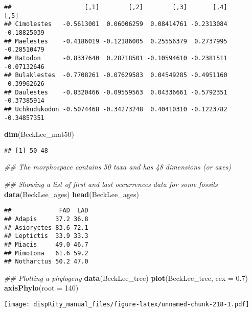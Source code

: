 \documentclass[
]{book}
\newenvironment{Shaded}{\begin{snugshade}}{\end{snugshade}}
\newcommand{\CommentTok}[1]{\textcolor[rgb]{0.56,0.35,0.01}{\textit{#1}}}
\newcommand{\DataTypeTok}[1]{\textcolor[rgb]{0.13,0.29,0.53}{#1}}
\newcommand{\DecValTok}[1]{\textcolor[rgb]{0.00,0.00,0.81}{#1}}
\newcommand{\FloatTok}[1]{\textcolor[rgb]{0.00,0.00,0.81}{#1}}
\newcommand{\KeywordTok}[1]{\textcolor[rgb]{0.13,0.29,0.53}{\textbf{#1}}}
\newcommand{\NormalTok}[1]{#1}
\begin{document}
\begin{verbatim}
##                    [,1]        [,2]        [,3]       [,4]        [,5]
## Cimolestes   -0.5613001  0.06006259  0.08414761 -0.2313084 -0.18825039
## Maelestes    -0.4186019 -0.12186005  0.25556379  0.2737995 -0.28510479
## Batodon      -0.8337640  0.28718501 -0.10594610 -0.2381511 -0.07132646
## Bulaklestes  -0.7708261 -0.07629583  0.04549285 -0.4951160 -0.39962626
## Daulestes    -0.8320466 -0.09559563  0.04336661 -0.5792351 -0.37385914
## Uchkudukodon -0.5074468 -0.34273248  0.40410310 -0.1223782 -0.34857351
\end{verbatim}

\begin{Shaded}
\begin{Highlighting}[]
\KeywordTok{dim}\NormalTok{(BeckLee\_mat50)}
\end{Highlighting}
\end{Shaded}

\begin{verbatim}
## [1] 50 48
\end{verbatim}

\begin{Shaded}
\begin{Highlighting}[]
\CommentTok{\#\# The morphospace contains 50 taxa and has 48 dimensions (or axes)}

\CommentTok{\#\# Showing a list of first and last occurrences data for some fossils}
\KeywordTok{data}\NormalTok{(BeckLee\_ages)}
\KeywordTok{head}\NormalTok{(BeckLee\_ages)}
\end{Highlighting}
\end{Shaded}

\begin{verbatim}
##             FAD  LAD
## Adapis     37.2 36.8
## Asioryctes 83.6 72.1
## Leptictis  33.9 33.3
## Miacis     49.0 46.7
## Mimotona   61.6 59.2
## Notharctus 50.2 47.0
\end{verbatim}

\begin{Shaded}
\begin{Highlighting}[]
\CommentTok{\#\# Plotting a phylogeny}
\KeywordTok{data}\NormalTok{(BeckLee\_tree)}
\KeywordTok{plot}\NormalTok{(BeckLee\_tree, }\DataTypeTok{cex =} \FloatTok{0.7}\NormalTok{)}
\KeywordTok{axisPhylo}\NormalTok{(}\DataTypeTok{root =} \DecValTok{140}\NormalTok{)}
\end{Highlighting}
\end{Shaded}

\texttt{[image: dispRity\_manual\_files/figure-latex/unnamed-chunk-218-1.pdf]}
\end{document}
